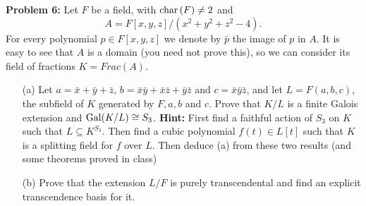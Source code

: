 \documentclass[12pt]{amsart}
\begin{document}
\skv
{\bf Problem 6: } Let $F$ be a field, with ${\rm char\,}(F)\neq 2$ 
and $$A=F[x,y,z]/(x^2+y^2+z^2-4).$$ For every polynomial $p\in F[x,y,z]$ 
we denote by $\bar p$ the image of $p$ in $A$. It is easy to see that $A$ is a domain (you need not prove this), so we can consider its field of fractions
$K=Frac(A)$. 

 \begin{itemize}
 \item[(a)] Let $a=\bar x+\bar y+\bar z$, $b=\bar x\bar y+ \bar x\bar z + \bar y\bar z$
and $c=\bar x\bar y\bar z$, and let $L=F(a,b,c)$, the subfield of $K$ generated by $F,a,b$ and $c$. 
Prove that $K/L$ is a finite Galois extension and ${\rm Gal}(K/L)\cong S_3$. 
\skv
\noindent
{\bf Hint:} First find a faithful action of $S_3$ on $K$ such that $L\subseteq K^{S_3}$.
Then find a cubic polynomial $f(t)\in L[t]$ such that $K$ is a splitting field for $f$ over $L$. Then deduce (a) from these two results
(and some theorems proved in class)
\item[(b)] Prove that the extension $L/F$ is purely transcendental and find an explicit transcendence basis for it. 
\end{itemize} 
\end{document}
